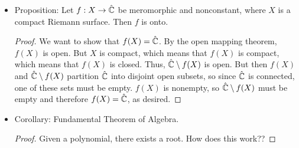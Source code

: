 \documentclass[../notes.tex]{subfiles}
\begin{document}
\begin{itemize}
    \item Proposition: Let $f:X\to\hat{\mathbb{C}}$ be meromorphic and nonconstant, where $X$ is a compact Riemann surface. Then $f$ is onto.
    \begin{proof}
        We want to show that $f(X)=\hat{\mathbb{C}}$. By the open mapping theorem, $f(X)$ is open. But $X$ is compact, which means that $f(X)$ is compact, which means that $f(X)$ is closed. Thus, $\hat{\mathbb{C}}\setminus f(X)$ is open. But then $f(X)$ and $\hat{\mathbb{C}}\setminus f(X)$ partition $\hat{\mathbb{C}}$ into disjoint open subsets, so since $\hat{\mathbb{C}}$ is connected, one of these sets must be empty. $f(X)$ is nonempty, so $\hat{\mathbb{C}}\setminus f(X)$ must be empty and therefore $f(X)=\hat{\mathbb{C}}$, as desired.
    \end{proof}
    \item Corollary: Fundamental Theorem of Algebra.
    \begin{proof}
        Given a polynomial, there exists a root. How does this work??
    \end{proof}
\end{itemize}
\end{document}
